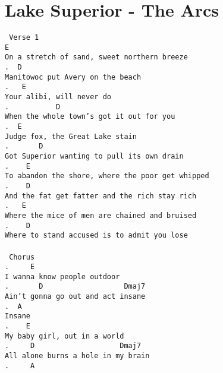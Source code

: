 \newpage
\section{Lake Superior - The Arcs}
\label{Lake Superior - The Arcs}
\texttt{\lbrack\ Verse\ 1\rbrack\\
E\\
On\ a\ stretch\ of\ sand,\ sweet\ northern\ breeze\\
.\ \ D\\
Manitowoc\ put\ Avery\ on\ the\ beach\\
.\ \ \ E\\
Your\ alibi,\ will\ never\ do\\
.\ \ \ \ \ \ \ \ \ \ \ D\\
When\ the\ whole\ town's\ got\ it\ out\ for\ you\\
.\ \ E\\
Judge\ fox,\ the\ Great\ Lake\ stain\\
.\ \ \ \ \ \ \ D\\
Got\ Superior\ wanting\ to\ pull\ its\ own\ drain\\
.\ \ \ \ E\\
To\ abandon\ the\ shore,\ where\ the\ poor\ get\ whipped\\
.\ \ \ \ D\\
And\ the\ fat\ get\ fatter\ and\ the\ rich\ stay\ rich\\
.\ \ \ E\\
Where\ the\ mice\ of\ men\ are\ chained\ and\ bruised\\
.\ \ \ \ D\\
Where\ to\ stand\ accused\ is\ to\ admit\ you\ lose\\
\\
\lbrack\ Chorus\rbrack\\
.\ \ \ \ \ E\\
I\ wanna\ know\ people\ outdoor\\
.\ \ \ \ \ \ \ D\ \ \ \ \ \ \ \ \ \ \ \ \ \ \ \ \ \ \ Dmaj7\\
Ain't\ gonna\ go\ out\ and\ act\ insane\\
.\ \ A\\
Insane\\
.\ \ \ \ E\\
My\ baby\ girl,\ out\ in\ a\ world\\
.\ \ \ \ \ D\ \ \ \ \ \ \ \ \ \ \ \ \ \ \ \ \ \ \ \ Dmaj7\\
All\ alone\ burns\ a\ hole\ in\ my\ brain\\
.\ \ \ \ \ A\\
}

